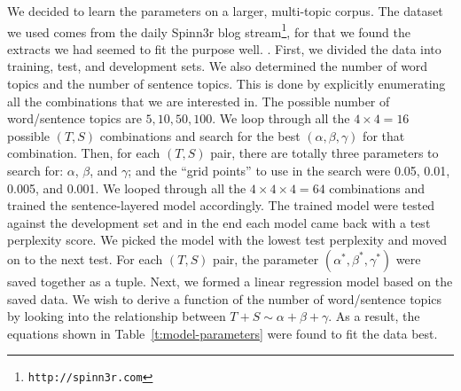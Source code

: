 We decided to learn the parameters on a larger, multi-topic corpus.  The
dataset we used comes from the daily Spinn3r blog stream\footnote{\tt http://spinn3r.com}, for that we found the
extracts we had seemed to fit the purpose well.  .  First, we divided the data into training, test, and development
sets.  We also determined the number of word topics and the number of sentence
topics.  This is done by explicitly enumerating all the combinations that we
are interested in.  The possible number of word/sentence topics are ${5, 10,
50, 100}$.   We loop through all the $4 \times 4 = 16$ possible $(T,S)$
combinations and search for the best $(\alpha, \beta, \gamma)$ for that
combination.  Then, for each $(T, S)$ pair, there are totally three parameters
to search for: $\alpha$, $\beta$, and $\gamma$; and the ``grid points'' to use
in the search were 0.05, 0.01, 0.005, and 0.001.  We looped through all the $4
\times 4 \times 4 = 64$ combinations and trained the sentence-layered model
accordingly.  The trained model were tested against the development set and in
the end each model came back with a test perplexity score.  We picked the
model with the lowest test perplexity and moved on to the next test.  For each
$(T, S)$ pair, the parameter $(\alpha^*, \beta^*, \gamma^*)$ were saved
together as a tuple.  Next, we formed a linear regression model based on the
saved data.  We wish to derive a function of the number of word/sentence topics
by looking into the relationship between $T + S \sim \alpha + \beta + \gamma$.
As a result, the equations shown in Table~\ref{t:model-parameters} were found
to fit the data best.

